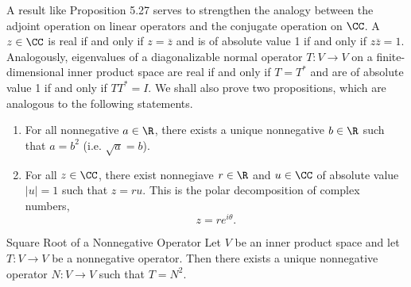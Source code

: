 \documentclass[linearalgebraII]{subfiles}
\begin{document}
    \begin{remark}
        A result like Proposition 5.27 serves to strengthen the analogy between the adjoint operation on linear operators and the conjugate operation on $\CC$. A $z\in\CC$ is real if and only if $z=\overline{z}$ and is of absolute value 1 if and only if $z\overline{z} =1$. Analogously, eigenvalues of a diagonalizable normal operator $T:V\to V$ on a finite-dimensional inner product space are real if and only if $T=T^*$ and are of absolute value 1 if and only if $TT^* = I$. We shall also prove two propositions, which are analogous to the following statements.
        \begin{enumerate}
            \item For all nonnegative $a\in\R$, there exists a unique nonnegative $b\in\R$ such that $a=b^2$ (i.e. $\sqrt{a}=b$).
            \item For all $z\in\CC$, there exist nonnegiave $r\in\R$ and $u\in\CC$ of absolute value $\left| u \right| =1$ such that $z=ru$. This is the polar decomposition of complex numbers,
                \begin{equation*}
                    z = re^{i\theta}.
                \end{equation*}
        \end{enumerate}
    \end{remark}

    \begin{prop}{Square Root of a Nonnegative Operator}
        Let $V$ be an inner product space and let $T:V\to V$ be a nonnegative operator. Then there exists a unique nonnegative operator $N:V\to V$ such that $T=N^2$.
    \end{prop}
\end{document}
